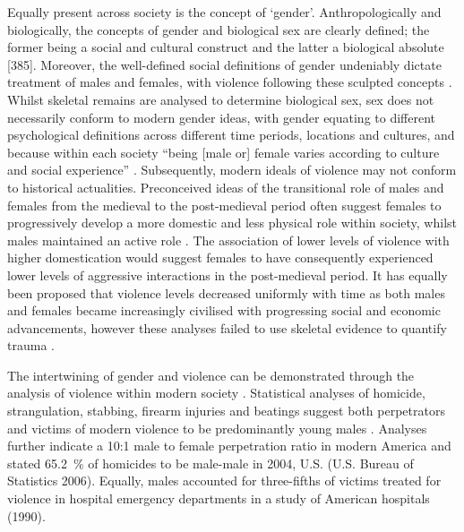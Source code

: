 Equally present across society is the concept of ‘gender’. Anthropologically and biologically, the concepts of gender and biological sex are clearly defined; the former being a social and cultural construct and the latter a biological absolute \parencites{unger1979}{deaux1985}[385]. Moreover, the well-defined social definitions of gender undeniably dictate treatment of males and females, with violence following these sculpted concepts \parencites{gurr1981}{belknap2001}{mccall2008}. 
Whilst skeletal remains are analysed to determine biological sex, sex does not necessarily conform to modern gender ideas, with gender equating to different psychological definitions across different time periods, locations and cultures, and because within each society “being [male or] female varies according to culture and social experience” \parencite{redfern2013}. 
Subsequently, modern ideals of violence may not conform to historical actualities.  Preconceived ideas of the transitional role of males and females from the medieval to the post-medieval period often suggest females to progressively develop a more domestic and less physical role within society, whilst males maintained an active role \parencite{robb1997}.  
The association of lower levels of violence with higher domestication would suggest females to have consequently experienced lower levels of aggressive interactions in the post-medieval period. It has equally been proposed that violence levels decreased uniformly with time as both males and females became increasingly civilised with progressing social and economic advancements, however these analyses failed to use skeletal evidence to quantify trauma \parencite{beattie1974}.  

The intertwining of gender and violence can be demonstrated through the analysis of violence within modern society \parencite{hendricks2007}. 
Statistical analyses of homicide, strangulation, stabbing, firearm injuries and beatings suggest both perpetrators and victims of modern violence to be predominantly young males \parencite{baker1992}.  
Analyses further indicate a 10:1 male to female perpetration ratio in modern America \parencite{anderson2002} and stated \SI{65.2}{\percent} 
of homicides to be male-male in 2004, U.S. (U.S. Bureau of Statistics 2006). Equally, males accounted for three-fifths of victims treated for violence in hospital emergency departments in a study of American hospitals (1990). 

